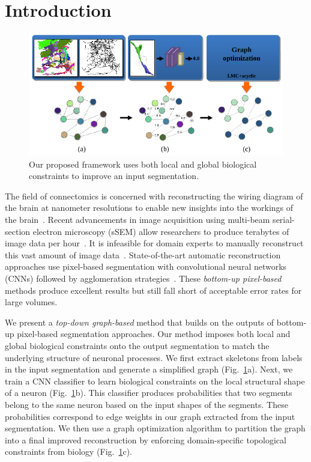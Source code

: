 \section{Introduction}

\begin{figure}[t!]
	\centering
	\includegraphics[width=\linewidth]{./figures/teaser_v2.png}
	\caption{Our proposed framework uses both local and global biological constraints to improve an input segmentation.}
	\label{fig:teaser}
\end{figure}


The field of connectomics is concerned with reconstructing the wiring diagram of the brain at nanometer resolutions to enable new insights into the workings of the brain~\cite{haehn2017scalable,kasthuri2015saturated}. 
Recent advancements in image acquisition using multi-beam serial-section electron microscopy (sSEM) allow researchers to produce terabytes of image data per hour~\cite{hildebrand2017whole}. 
It is infeasible for domain experts to manually reconstruct this vast amount of image data~\cite{haehn2014design}. 
State-of-the-art automatic reconstruction approaches use pixel-based segmentation with convolutional neural networks (CNNs) followed by agglomeration strategies~\cite{seymour2016rhoananet,lee2015recursive,nunez2014graph,parag2017anisotropic,ronneberger2015u,zlateski2015image}.
These \textit{bottom-up pixel-based} methods produce excellent results but still fall short of acceptable error rates for large volumes.

We present a \textit{top-down graph-based} method that builds on the outputs of bottom-up pixel-based segmentation approaches. 
Our method imposes both local and global biological constraints onto the output segmentation to match the underlying structure of neuronal processes.
We first extract skeletons from labels in the input segmentation and generate a simplified graph (Fig.~\ref{fig:teaser}a). 
Next, we train a CNN classifier to learn biological constraints on the local structural shape of a neuron (Fig.~\ref{fig:teaser}b). 
This classifier produces probabilities that two segments belong to the same neuron based on the input shapes of the segments.
These probabilities correspond to edge weights in our graph extracted from the input segmentation.
We then use a graph optimization algorithm to partition the graph into a final improved reconstruction by enforcing domain-specific topological constraints from biology (Fig.~\ref{fig:teaser}c).

